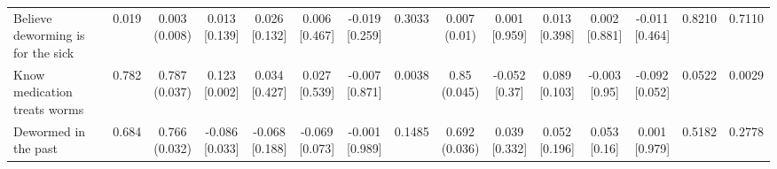 {\begin{tabular}[t]{lcccccccccccccc}
\hspace{1em}Believe deworming is for the sick & 0.019 & \makecell[c]{0.003\\(0.008)} & \makecell[c]{0.013\\{[0.139]}} & \makecell[c]{0.026\\{[0.132]}} & \makecell[c]{0.006\\{[0.467]}} & \makecell[c]{-0.019\\{[0.259]}} & 0.3033 & \makecell[c]{0.007\\(0.01)} & \makecell[c]{0.001\\{[0.959]}} & \makecell[c]{0.013\\{[0.398]}} & \makecell[c]{0.002\\{[0.881]}} & \makecell[c]{-0.011\\{[0.464]}} & 0.8210 & 0.7110\\
\hspace{1em}Know medication treats worms & 0.782 & \makecell[c]{0.787\\(0.037)} & \makecell[c]{0.123\\{[0.002]}} & \makecell[c]{0.034\\{[0.427]}} & \makecell[c]{0.027\\{[0.539]}} & \makecell[c]{-0.007\\{[0.871]}} & 0.0038 & \makecell[c]{0.85\\(0.045)} & \makecell[c]{-0.052\\{[0.37]}} & \makecell[c]{0.089\\{[0.103]}} & \makecell[c]{-0.003\\{[0.95]}} & \makecell[c]{-0.092\\{[0.052]}} & 0.0522 & 0.0029\\
\hspace{1em}Dewormed in the past & 0.684 & \makecell[c]{0.766\\(0.032)} & \makecell[c]{-0.086\\{[0.033]}} & \makecell[c]{-0.068\\{[0.188]}} & \makecell[c]{-0.069\\{[0.073]}} & \makecell[c]{-0.001\\{[0.989]}} & 0.1485 & \makecell[c]{0.692\\(0.036)} & \makecell[c]{0.039\\{[0.332]}} & \makecell[c]{0.052\\{[0.196]}} & \makecell[c]{0.053\\{[0.16]}} & \makecell[c]{0.001\\{[0.979]}} & 0.5182 & 0.2778\\

\end{tabular}}
